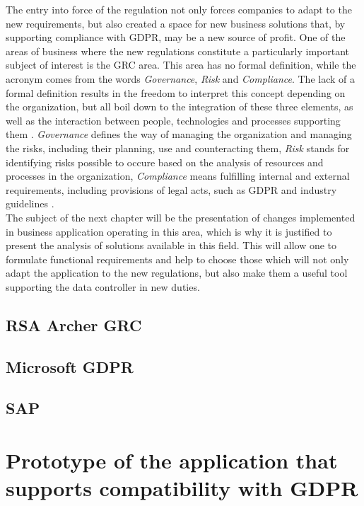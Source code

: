 \documentclass[en, noamssymb]{mgr}
\begin{document}
The entry into force of the regulation not only forces companies to adapt to the new requirements, but also created a space for new business solutions that, by supporting compliance with GDPR, may be a new source of profit. One of the areas of business where the new regulations constitute a particularly important subject of interest is the GRC area. This area has no formal definition, while the acronym comes from the words \textit{Governance}, \textit{Risk} and \textit{Compliance}. The lack of a formal definition results in the freedom to interpret this concept depending on the organization, but all boil down to the integration of these three elements, as well as the interaction between people, technologies and processes supporting them \cite{grc_2017}. \textit{Governance} defines the way of managing the organization and managing the risks, including their planning, use and counteracting them, \textit{Risk} stands for identifying risks possible to occure based on the analysis of resources and processes in the organization, \textit{Compliance} means fulfilling internal and external requirements, including provisions of legal acts, such as GDPR and industry guidelines \cite{grc_2017}.\\
\indent The subject of the next chapter will be the presentation of changes implemented in business application operating in this area, which is why it is justified to present the analysis of solutions available in this field. This will allow one to formulate functional requirements and help to choose those which will not only adapt the application to the new regulations, but also make them a useful tool supporting the data controller in new duties.

\section{RSA Archer GRC}



\section{Microsoft GDPR}



\section{SAP}



\chapter{Prototype of the application that supports compatibility with GDPR}\label{sec:sekcjaOpisPrototypu}
\end{document}
